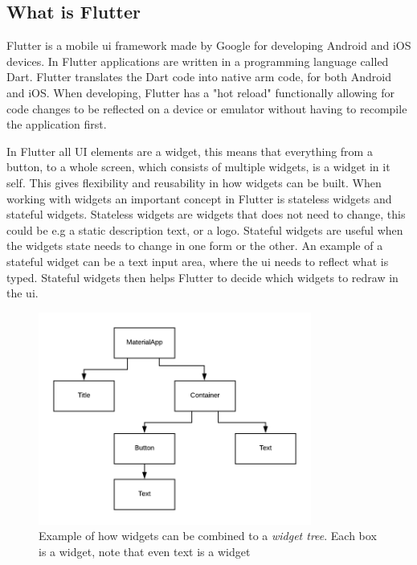 \subsection{What is Flutter}


Flutter is a mobile \gls{ui} framework made by Google for developing Android and iOS devices\cite{flutterFAQ}. In Flutter applications  are written in a programming language called Dart. Flutter translates the Dart code into native arm code, for both Android and iOS. When developing, Flutter has a "hot reload" functionally allowing for code changes to be reflected on a device or emulator without having to recompile the application first.

In Flutter all UI elements are a widget, this means that everything from a  button, to a  whole screen, which consists of multiple widgets, is a widget in it self. This gives flexibility and reusability in how widgets can be built. When working with widgets an important concept in Flutter is stateless widgets and stateful widgets. Stateless widgets are widgets that does not need to change, this could be  e.g a static description text, or a logo. Stateful widgets are useful when the widgets state needs to change in one form or the other.  An example of a stateful widget can be a text input area, where the \gls{ui} needs to reflect what is typed. Stateful widgets then helps Flutter to decide which widgets to redraw in the \gls{ui}.

\begin{figure}[h]
    \centering
    \includegraphics[width=0.8\textwidth]{figures/WidgetTree.png}
    \caption{Example of how widgets can be combined to a \textit{widget tree}. Each box is a widget, note that even text is a widget}
    \label{fig:WidgetTree}
\end{figure}

